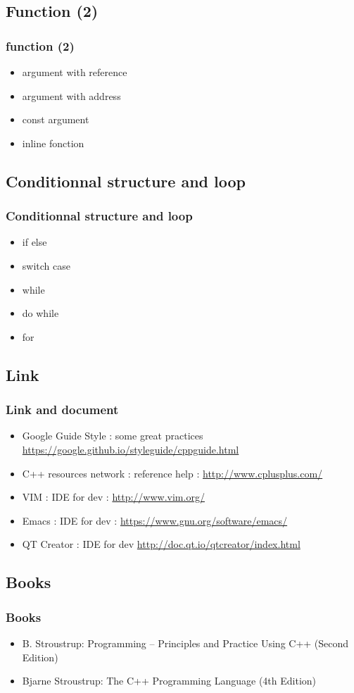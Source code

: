 \documentclass{beamer}
\begin{document}
\subsection{Function (2)}
\label{sub:function_2_}

\begin{frame}
	\frametitle{function (2)}
	\begin{itemize}
		\item argument with reference
		\item argument with address
		\item const argument
		\item inline fonction
	\end{itemize}
\end{frame}

\subsection{Conditionnal structure and loop}
\label{sub:condition}

\begin{frame}
	\frametitle{Conditionnal structure and loop}
	\begin{itemize}
		\item if else
		\item switch case
		\item while
		\item do while
		\item for
	\end{itemize}
\end{frame}

\subsection{Link}
\label{sub:link}

\begin{frame}
	\frametitle{Link and document}
	\begin{itemize}
		\item Google Guide Style : some great practices \url{https://google.github.io/styleguide/cppguide.html}
		\item C++ resources network : reference help : \url{http://www.cplusplus.com/}
		\item VIM : IDE for dev : \url{http://www.vim.org/} 
		\item Emacs : IDE for dev : \url{https://www.gnu.org/software/emacs/} 
		\item QT Creator : IDE for dev \url{http://doc.qt.io/qtcreator/index.html} 
	\end{itemize}
\end{frame}

\subsection{Books}
\label{sub:books_}


\begin{frame}
	\frametitle{Books}
	\begin{itemize}
		\item B. Stroustrup: Programming -- Principles and Practice Using C++ (Second Edition)
		\item Bjarne Stroustrup: The C++ Programming Language (4th Edition)
	\end{itemize}
\end{frame}
\end{document}
